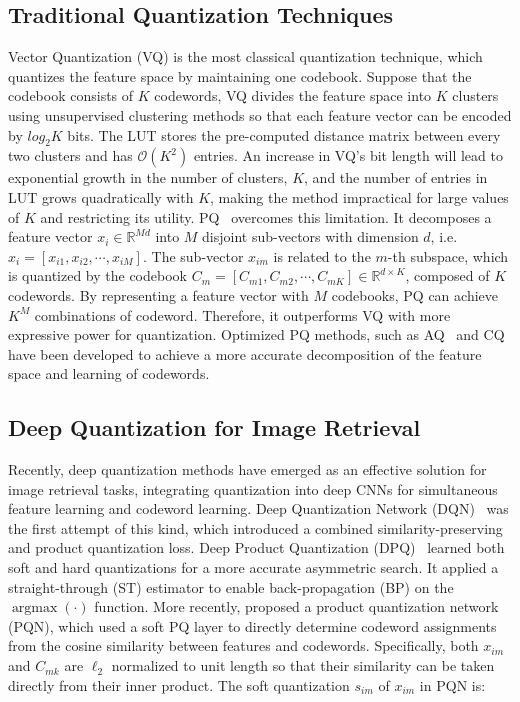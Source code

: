 \documentclass{elsarticle}
\DeclareMathOperator*{\argmax}{argmax}
\begin{document}
\subsection{Traditional Quantization Techniques}
Vector Quantization (VQ) is the most classical quantization technique, which quantizes the feature space by maintaining one codebook. Suppose that the codebook consists of $K$ codewords, VQ divides the feature space into $K$ clusters using unsupervised clustering methods so that each feature vector can be encoded by $log_2 K$ bits. The LUT stores the pre-computed distance matrix between every two clusters and has $\mathcal{O}(K^2)$ entries. An increase in VQ's bit length will lead to exponential growth in the number of clusters, $K$, and the number of entries in LUT grows quadratically with $K$, making the method impractical for large values of $K$ and restricting its utility. PQ~\cite{jegou2010product} overcomes this limitation. It decomposes a feature vector $x_{i}\in \mathbb{R}^{Md}$ into $M$ disjoint sub-vectors with dimension $d$, i.e. $x_i = [x_{i1}, x_{i2},\cdots,x_{iM}]$. The sub-vector $x_{im}$ is related to the $m$-th subspace, which is quantized by the codebook $C_m = [C_{m1}, C_{m2},\cdots, C_{mK}] \in \mathbb{R}^{d \times K}$, composed of $K$ codewords. By representing a feature vector with $M$ codebooks, PQ can achieve $K^M$ combinations of codeword. Therefore, it outperforms VQ with more expressive power for quantization. Optimized PQ methods, such as AQ~\cite{babenko2014additive} and CQ~\cite{zhang2014composite} have been developed to achieve a more accurate decomposition of the feature space and learning of codewords. 

\subsection{Deep Quantization for Image Retrieval}
Recently, deep quantization methods have emerged as an effective solution for image retrieval tasks, integrating quantization into deep CNNs for simultaneous feature learning and codeword learning. Deep Quantization Network (DQN)~\cite{cao2016deep} was the first attempt of this kind, which introduced a combined similarity-preserving and product quantization loss.
Deep Product Quantization (DPQ)~\cite{klein2019end} learned both soft and hard quantizations for a more accurate asymmetric search. It applied a straight-through (ST) estimator to enable back-propagation (BP) on the $\argmax(\cdot)$ function. More recently, \cite{yu2018product} proposed a product quantization network (PQN), which used a soft PQ layer to directly determine codeword assignments from the cosine similarity between features and codewords. Specifically, both $x_{im}$ and $C_{mk}$ are $\ell_2$ normalized to unit length so that their similarity can be taken directly from their inner product. The soft quantization $s_{im}$ of $x_{im}$ in PQN is:
\end{document}
